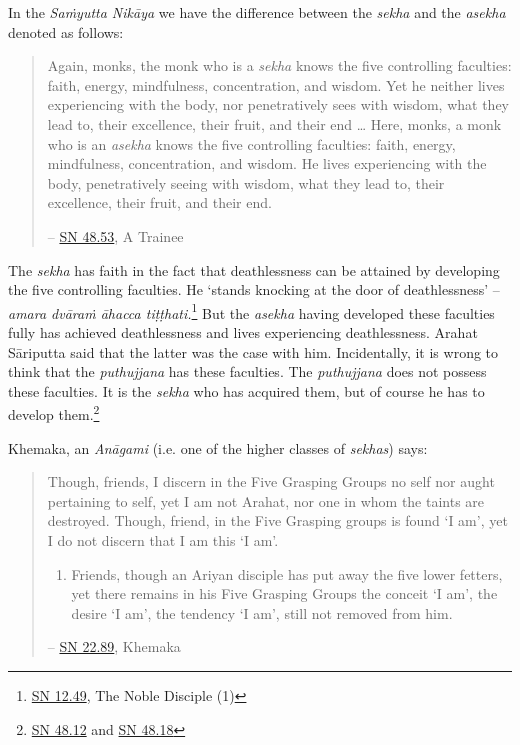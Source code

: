 In the \textit{Saṁyutta Nikāya} we have the difference between the \textit{sekha} and the \textit{asekha} denoted as follows:

\begin{quote}
Again, monks, the monk who is a \textit{sekha} knows the five controlling faculties: faith, energy, mindfulness, concentration, and wisdom. Yet he neither lives experiencing with the body, nor penetratively sees with wisdom, what they lead to, their excellence, their fruit, and their end \ldots\hspace{0pt} Here, monks, a monk who is an \textit{asekha} knows the five controlling faculties: faith, energy, mindfulness, concentration, and wisdom. He lives experiencing with the body, penetratively seeing with wisdom, what they lead to, their excellence, their fruit, and their end.

 -- \href{https://suttacentral.net/sn48.53/en/sujato}{SN 48.53}, A Trainee
\end{quote}

The \textit{sekha} has faith in the fact that deathlessness can be attained by developing the five controlling faculties. He `stands knocking at the door of deathlessness' -- \textit{amara dvāraṁ āhacca tiṭṭhati.}\footnote{\href{https://suttacentral.net/sn12.49/en/bodhi}{SN 12.49}, The Noble Disciple (1)} But the \textit{asekha} having developed these faculties fully has achieved deathlessness and lives experiencing deathlessness. Arahat Sāriputta said that the latter was the case with him. Incidentally, it is wrong to think that the \textit{puthujjana} has these faculties. The \textit{puthujjana} does not possess these faculties. It is the \textit{sekha} who has acquired them, but of course he has to develop them.\footnote{\href{https://suttacentral.net/sn48.12/en/sujato}{SN 48.12} and \href{https://suttacentral.net/sn48.18/en/sujato}{SN 48.18}}

Khemaka, an \textit{Anāgami} (i.e. one of the higher classes of \textit{sekhas}) says:

\begin{quote}
Though, friends, I discern in the Five Grasping Groups no self nor aught pertaining to self, yet I am not Arahat, nor one in whom the taints are destroyed. Though, friend, in the Five Grasping groups is found `I am', yet I do not discern that I am this `I am'.

\begin{enumerate}
\def\labelenumi{\roman{enumi}.}
\item
  Friends, though an Ariyan disciple has put away the five lower fetters, yet there remains in his Five Grasping Groups the conceit `I am', the desire `I am', the tendency `I am', still not removed from him.
\end{enumerate}

 -- \href{https://suttacentral.net/sn22.89/en/bodhi}{SN 22.89}, Khemaka
\end{quote}

